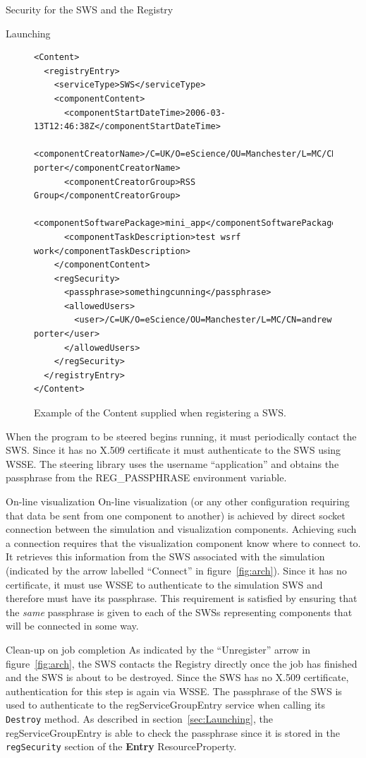 \documentclass[a4paper]{article}
\begin{document}
\begin{section}{Security for the SWS and the Registry}
\begin{subsection}{Launching}
\begin{figure}
\begin{verbatim}
<Content>
  <registryEntry>
    <serviceType>SWS</serviceType>
    <componentContent>
      <componentStartDateTime>2006-03-13T12:46:38Z</componentStartDateTime>
      <componentCreatorName>/C=UK/O=eScience/OU=Manchester/L=MC/CN=andrew porter</componentCreatorName>
      <componentCreatorGroup>RSS Group</componentCreatorGroup>
      <componentSoftwarePackage>mini_app</componentSoftwarePackage>
      <componentTaskDescription>test wsrf work</componentTaskDescription>
    </componentContent>
    <regSecurity>
      <passphrase>somethingcunning</passphrase>
      <allowedUsers>
        <user>/C=UK/O=eScience/OU=Manchester/L=MC/CN=andrew porter</user>
      </allowedUsers>
    </regSecurity>
  </registryEntry>
</Content>
\end{verbatim}
\caption{Example of the Content supplied when registering a SWS.}
\label{fig:contentXML}
\end{figure}
When the program to be steered begins running, it must periodically contact the SWS.
Since it has no X.509 certificate it must authenticate to the SWS using WSSE.  The
steering library uses the username ``application'' and obtains the 
passphrase from the REG\_PASSPHRASE environment variable.
\end{subsection}


\begin{subsection}{On-line visualization}
On-line visualization (or any other configuration requiring that data
be sent from one component to another) is achieved by direct socket
connection between the simulation and visualization components.
Achieving such a connection requires that the visualization component
know where to connect to.  It retrieves this information from the SWS
associated with the simulation (indicated by the arrow labelled
``Connect'' in figure~\ref{fig:arch}).  Since it has no certificate,
it must use WSSE to authenticate to the simulation SWS and therefore
must have its passphrase.  This requirement is satisfied by ensuring
that the {\em same} passphrase is given to each of the SWSs representing
components that will be connected in some way.
\end{subsection} 

\begin{subsection}{Clean-up on job completion}
As indicated by the ``Unregister'' arrow in figure~\ref{fig:arch}, the SWS contacts
the Registry directly once the job has finished and the SWS is about to be destroyed.
Since the SWS has no X.509 certificate, authentication for this step is again via
WSSE.  The passphrase of the SWS is used to authenticate to the regServiceGroupEntry
service when calling its \texttt{Destroy} method.  As described in 
section~\ref{sec:Launching}, the
regServiceGroupEntry is able to check the passphrase since it is stored in the
\texttt{regSecurity} section of the {\bf Entry} ResourceProperty.
\end{subsection}

\end{section}
\end{document}
